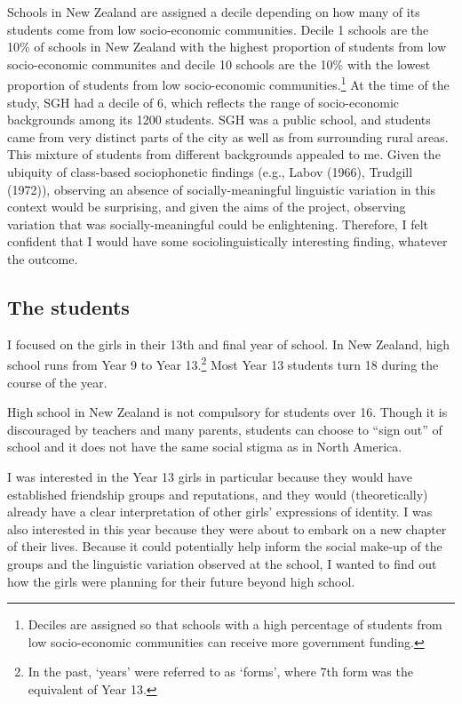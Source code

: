 Schools in New Zealand are assigned a decile depending on how many of its students come from low socio-economic communities.  Decile 1 schools are the 10\% of schools in New Zealand with the highest proportion of students from low socio-economic communites and decile 10 schools are the 10\% with the lowest proportion of students from low socio-economic communities.\footnote{Deciles are assigned so that schools with a high percentage of students from low socio-economic communities can receive more government funding.} At the time of the study, SGH had a decile of 6, which reflects the range of socio-economic backgrounds among its 1200 students. SGH was a public school, and students came from very distinct parts of the city as well as from surrounding rural areas.  This mixture of students from different backgrounds appealed to me.  Given the ubiquity of class-based sociophonetic findings (e.g., Labov (1966), Trudgill (1972)), observing an absence of socially-meaningful linguistic variation in this context would be surprising, and given the aims of the project, observing variation that was socially-meaningful could be enlightening.  Therefore, I felt confident that I would have some sociolinguistically interesting finding, whatever the outcome. \nocite{labov1966} \nocite{trudgill1972}


\subsection{The students}
I focused on the girls in their 13th and final year of school.  In New Zealand, high school runs from Year 9 to Year 13.\footnote{In the past, `years' were referred to as `forms', where 7th form was the equivalent of Year 13.}  Most Year 13 students turn 18 during the course of the year.  

High school in New Zealand is not compulsory for students over 16.  Though it is discouraged by teachers and many parents, students can choose to ``sign out'' of school and it does not have the same social stigma as in North America.  

I was interested in the Year 13 girls in particular because they would have established friendship groups and reputations, and they would (theoretically) already have a clear interpretation of other girls' expressions of identity.  I was also interested in this year because they were about to embark on a new chapter of their lives.  Because it could potentially help inform the social make-up of the groups and the linguistic variation observed at the school, I wanted to find out how the girls were planning for their future beyond high school.

